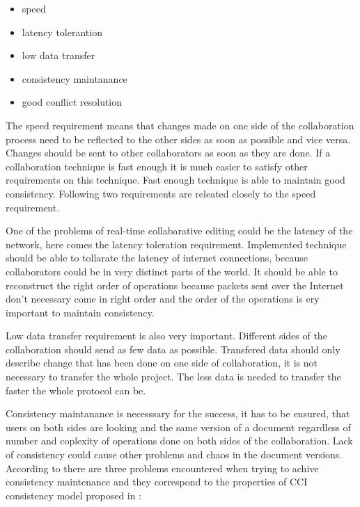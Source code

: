 \documentclass[12pt,oneside,draft]{fithesis2}
\begin{document}
\begin{itemize}
\item speed
\item latency tolerantion
\item low data transfer
\item consistency maintanance
\item good conflict resolution
\end{itemize}
\par The speed requirement means that changes made on one side of the collaboration process need to be reflected to the other sides as soon as possible and vice versa. Changes should be sent to other collaborators as soon as they are done. If a collaboration technique is fast enough it is much easier to satisfy other requirements on this technique. Fast enough technique is able to maintain good consistency. Following two requirements are releated closely to the speed requirement. \par One of the problems of real-time collabarative editing could be the latency of the network, here comes the latency toleration requirement. Implemented technique should be able to tollarate the latency of internet connections, because collaborators could be in very distinct parts of the world. It should be able to reconstruct the right order of operations because packets sent over the Internet don't necessary come in right order and the order of the operations is ery important to maintain consistency.\par Low data transfer requirement is also very important. Different sides of the collaboration should send as few data as possible. Transfered data should only describe change that has been done on one side of collaboration, it is not necessary to transfer the whole project. The less data is needed to transfer the faster the whole protocol can be.  \par Consistency maintanance is necesssary for the success, it has to be ensured, that users on both sides are looking and the same version of a document regardless of number and coplexity of operations done on both sides of the collaboration. Lack of consistency could cause other problems and chaos in the document versions. According to \cite{Vidot} there are three problems encountered when trying to achive consistency maintenance and they correspond to the properties of CCI consistency model proposed in \cite{Sun}:
\end{document}
